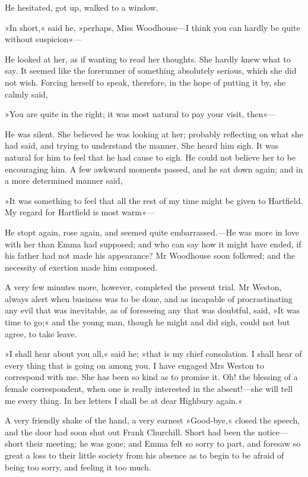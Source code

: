 He hesitated, got up, walked to a window.

»In short,« said he, »perhaps, Miss Woodhouse—I think you can hardly be quite without suspicion«—

He looked at her, as if wanting to read her thoughts. She hardly knew what to say. It seemed like the forerunner of something absolutely serious, which she did not wish. Forcing herself to speak, therefore, in the hope of putting it by, she calmly said,

»You are quite in the right; it was most natural to pay your visit, then«—

He was silent. She believed he was looking at her; probably reflecting on what she had said, and trying to understand the manner. She heard him sigh. It was natural for him to feel that he had cause to sigh. He could not believe her to be encouraging him. A few awkward moments passed, and he sat down again; and in a more determined manner said,

»It was something to feel that all the rest of my time might be given to Hartfield. My regard for Hartfield is most warm«—

He stopt again, rose again, and seemed quite embarrassed.—He was more in love with her than Emma had supposed; and who can say how it might have ended, if his father had not made his appearance? Mr Woodhouse soon followed; and the necessity of exertion made him composed.

A very few minutes more, however, completed the present trial. Mr Weston, always alert when business was to be done, and as incapable of procrastinating any evil that was inevitable, as of foreseeing any that was doubtful, said, »It was time to go;« and the young man, though he might and did sigh, could not but agree, to take leave.

»I shall hear about you all,« said he; »that is my chief consolation. I shall hear of every thing that is going on among you. I have engaged Mrs Weston to correspond with me. She has been so kind as to promise it. Oh! the blessing of a female correspondent, when one is really interested in the absent!—she will tell me every thing. In her letters I shall be at dear Highbury again.«

A very friendly shake of the hand, a very earnest »Good-bye,« closed the speech, and the door had soon shut out Frank Churchill. Short had been the notice—short their meeting; he was gone; and Emma felt so sorry to part, and foresaw so great a loss to their little society from his absence as to begin to be afraid of being too sorry, and feeling it too much.

